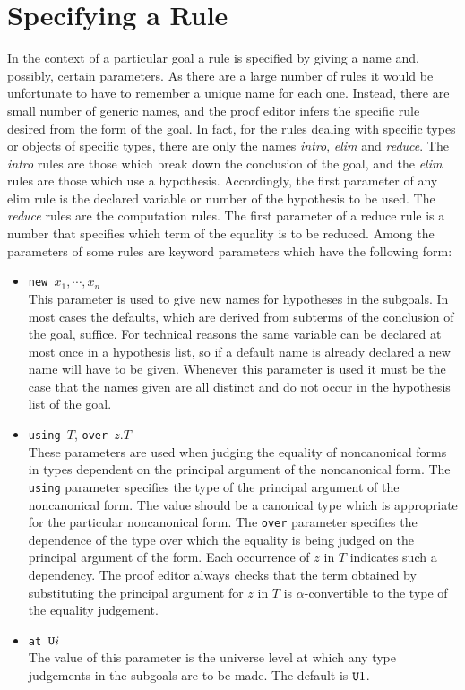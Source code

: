 \section{Specifying a Rule}
In the context of a particular goal a rule is specified by giving a name
and, possibly, certain parameters.
As there are a large number of rules 
it would be unfortunate to have to remember a unique name for each one.
Instead, there are small number of generic names, and the
proof editor
infers the specific rule desired from the form of the goal.
In fact, for the rules dealing with specific types or objects of specific
types, there are only the names {\em intro}, {\em elim} and {\em reduce}.
The {\em intro} rules are those which break down the conclusion of the goal,
and the {\em elim} rules are those which use a hypothesis.
Accordingly, the first parameter of any elim rule is the declared variable
or number of the hypothesis to be used.
The {\em reduce} rules are the computation rules.
The first parameter of a reduce rule is a number that specifies which 
term of the equality is to be reduced.
Among the parameters of some rules are keyword
parameters which have the following form:
\begin{itemize}
\item{\tt new $x_1,\cdots,x_n$}\\
This parameter is used to give new names for hypotheses
in the subgoals.
In most cases the defaults, which are derived from subterms of the conclusion
of the goal, suffice.
For technical reasons the same variable can be declared at most once in a
hypothesis list, so if a default name is already declared a new name will
have to be given.
Whenever this parameter is used it must be the case that the names given
are all distinct and do not occur in the hypothesis list of the goal.
\item{\tt using $T$}, {\tt over $z.T$} \\
These parameters are used when judging the equality of
noncanonical forms in
types dependent on the principal argument of the noncanonical form.
The {\tt using} parameter  specifies the type of the principal argument 
of the noncanonical form.
The value should be a canonical type which is appropriate for the
particular noncanonical form.
The {\tt over} parameter specifies the dependence of the
type over which the
equality is being judged on the principal argument of the form.
Each occurrence of $z$ in $T$ indicates such a dependency.
The proof editor always checks that the term obtained by substituting the
principal argument for $z$ in $T$ is
$\alpha$-convertible
to the type of the equality judgement.
\item{\tt at $\mbox{${\tt U}{i}$}$}\\
The value of this parameter is the universe level at which any type judgements
in the subgoals are to be made.  The default is $\mbox{${\tt U}{1}$}$.
\end{itemize}

